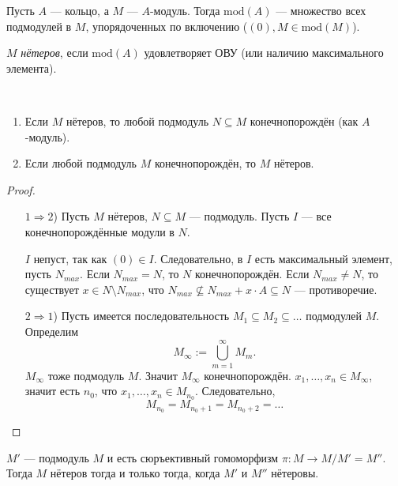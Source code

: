\documentclass[12pt,a4paper]{article}
\renewcommand{\mod}{\mathrm{mod}}
\begin{document}
    \begin{definition}
        Пусть $A$ --- кольцо, а $M$ --- $A$-модуль. Тогда $\mod(A)$ --- множество всех подмодулей в $M$, упорядоченных по включению ($(0), M \in \mod(M)$).

        $M$ \emph{нётеров}, если $\mod(A)$ удовлетворяет ОВУ (или наличию максимального элемента).
    \end{definition}

    \begin{lemma}\ \label{neotherian-modules-lemma}
        \begin{enumerate}
            \item Если $M$ нётеров, то любой подмодуль $N \subseteq M$ конечнопорождён (как $A$-модуль).
            \item Если любой подмодуль $M$ конечнопорождён, то $M$ нётеров.
        \end{enumerate}
    \end{lemma}

    \begin{proof}
        \begin{itemize}
            \item[$1 \Rightarrow 2$)] Пусть $M$ нётеров, $N \subseteq M$ --- подмодуль. Пусть $I$ --- все конечнопорождённые модули в $N$.

                $I$ непуст, так как $(0) \in I$. Следовательно, в $I$ есть максимальный элемент, пусть $N_{max}$. Если $N_{max} = N$, то $N$ конечнопорождён. Если $N_{max} \neq N$, то существует $x \in N \setminus N_{max}$, что $N_{max} \nsubseteq N_{max} + x \cdot A \subseteq N$ --- противоречие.
            
            \item[$2 \Rightarrow 1$)] Пусть имеется последовательность $M_1 \subseteq M_2 \subseteq \dots$ подмодулей $M$. Определим
                \[M_\infty := \bigcup_{m=1}^\infty M_m.\]
                $M_\infty$ тоже подмодуль $M$. Значит $M_\infty$ конечнопорождён. $x_1, \dots, x_n \in M_\infty$, значит есть $n_0$, что $x_1, \dots, x_n \in M_{n_0}$. Следовательно,
                    \[M_{n_0} = M_{n_0 + 1} = M_{n_0 + 2} = \dots\]
        \end{itemize}
    \end{proof}

    \begin{lemma}\label{factor-neotherianity-lemma}
        $M'$ --- подмодуль $M$ и есть сюръективный гомоморфизм $\pi: M \to M/M' = M''$. Тогда $M$ нётеров тогда и только тогда, когда $M'$ и $M''$ нётеровы.
    \end{lemma}
\end{document}
